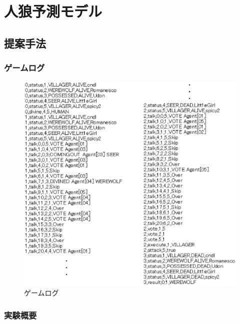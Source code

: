 \newpage
\changeindent{0cm}
\section{人狼予測モデル}
\label{sec:pred}
\changeindent{2cm}


\changeindent{0cm}
\subsection{提案手法}
\label{sec:pred.01}
\changeindent{2cm}

\changeindent{0cm}
\subsubsection{ゲームログ}
\label{sec:pred.01_01}
\changeindent{2cm}

\begin{figure}[t]
     \begin{center}
       \includegraphics[width=13cm,clip]{./fig/03.pred/log.eps}
      \end{center}
      \caption{ゲームログ}
     \label{fig:04_log}
\end{figure}


\changeindent{0cm}
\subsubsection{実験概要}
\label{sec:pred.01_03}
\changeindent{2cm}


